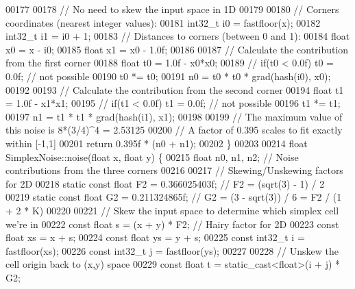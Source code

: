\begin{DoxyCode}
00177 
00178     \textcolor{comment}{// No need to skew the input space in 1D}
00179 
00180     \textcolor{comment}{// Corners coordinates (nearest integer values):}
00181     int32\_t i0 = fastfloor(x);
00182     int32\_t i1 = i0 + 1;
00183     \textcolor{comment}{// Distances to corners (between 0 and 1):}
00184     \textcolor{keywordtype}{float} x0 = x - i0;
00185     \textcolor{keywordtype}{float} x1 = x0 - 1.0f;
00186 
00187     \textcolor{comment}{// Calculate the contribution from the first corner}
00188     \textcolor{keywordtype}{float} t0 = 1.0f - x0*x0;
00189 \textcolor{comment}{//  if(t0 < 0.0f) t0 = 0.0f; // not possible}
00190     t0 *= t0;
00191     n0 = t0 * t0 * grad(hash(i0), x0);
00192 
00193     \textcolor{comment}{// Calculate the contribution from the second corner}
00194     \textcolor{keywordtype}{float} t1 = 1.0f - x1*x1;
00195 \textcolor{comment}{//  if(t1 < 0.0f) t1 = 0.0f; // not possible}
00196     t1 *= t1;
00197     n1 = t1 * t1 * grad(hash(i1), x1);
00198 
00199     \textcolor{comment}{// The maximum value of this noise is 8*(3/4)^4 = 2.53125}
00200     \textcolor{comment}{// A factor of 0.395 scales to fit exactly within [-1,1]}
00201     \textcolor{keywordflow}{return} 0.395f * (n0 + n1);
00202 \}
00203 
00214 \textcolor{keywordtype}{float} SimplexNoise::noise(\textcolor{keywordtype}{float} x, \textcolor{keywordtype}{float} y) \{
00215     \textcolor{keywordtype}{float} n0, n1, n2;   \textcolor{comment}{// Noise contributions from the three corners}
00216 
00217     \textcolor{comment}{// Skewing/Unskewing factors for 2D}
00218     \textcolor{keyword}{static} \textcolor{keyword}{const} \textcolor{keywordtype}{float} F2 = 0.366025403f;  \textcolor{comment}{// F2 = (sqrt(3) - 1) / 2}
00219     \textcolor{keyword}{static} \textcolor{keyword}{const} \textcolor{keywordtype}{float} G2 = 0.211324865f;  \textcolor{comment}{// G2 = (3 - sqrt(3)) / 6   = F2 / (1 + 2 * K)}
00220 
00221     \textcolor{comment}{// Skew the input space to determine which simplex cell we're in}
00222     \textcolor{keyword}{const} \textcolor{keywordtype}{float} s = (x + y) * F2;  \textcolor{comment}{// Hairy factor for 2D}
00223     \textcolor{keyword}{const} \textcolor{keywordtype}{float} xs = x + s;
00224     \textcolor{keyword}{const} \textcolor{keywordtype}{float} ys = y + s;
00225     \textcolor{keyword}{const} int32\_t i = fastfloor(xs);
00226     \textcolor{keyword}{const} int32\_t j = fastfloor(ys);
00227 
00228     \textcolor{comment}{// Unskew the cell origin back to (x,y) space}
00229     \textcolor{keyword}{const} \textcolor{keywordtype}{float} t = \textcolor{keyword}{static\_cast<}\textcolor{keywordtype}{float}\textcolor{keyword}{>}(i + j) * G2;

\end{DoxyCode}

